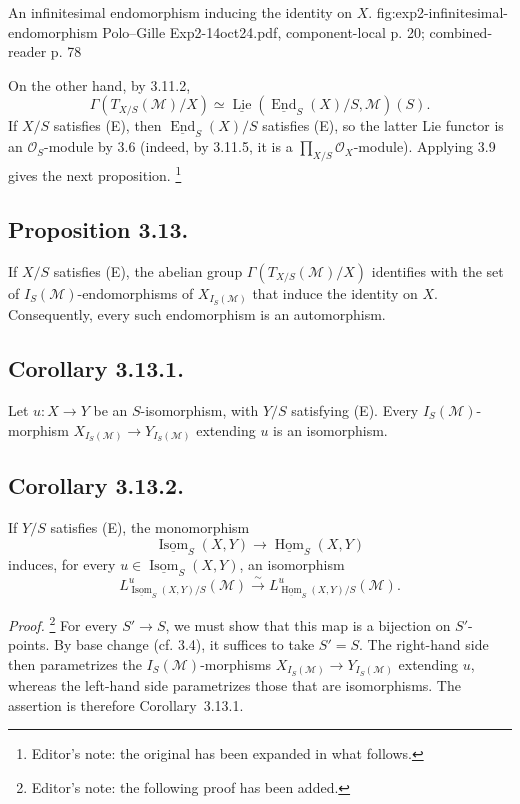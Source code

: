   {An infinitesimal endomorphism inducing the identity on \(X\).}
  {fig:exp2-infinitesimal-endomorphism}
  {Polo--Gille Exp2-14oct24.pdf, component-local p. 20; combined-reader p. 78}

On the other hand, by 3.11.2,
\[
  \Gamma(T_{X/S}(\mathcal M)/X)
  \simeq
  \underline{\operatorname{Lie}}
    (\underline{\operatorname{End}}_S(X)/S,\mathcal M)(S).
\]
If \(X/S\) satisfies (E), then
\(\underline{\operatorname{End}}_S(X)/S\) satisfies (E), so the latter
Lie functor is an \(\mathcal O_S\)-module by 3.6 (indeed, by 3.11.5, it
is a \(\prod_{X/S}\mathcal O_X\)-module). Applying 3.9 gives the next
proposition.
\footnote{Editor's note: the original has been expanded in what follows.}

\subsection*{Proposition 3.13.}
If \(X/S\) satisfies (E), the abelian group
\(\Gamma(T_{X/S}(\mathcal M)/X)\) identifies with the set of
\(I_S(\mathcal M)\)-endomorphisms of \(X_{I_S(\mathcal M)}\) that induce
the identity on \(X\). Consequently, every such endomorphism is an
automorphism.

\subsection*{Corollary 3.13.1.}
Let \(u:X\to Y\) be an \(S\)-isomorphism, with \(Y/S\) satisfying (E).
Every \(I_S(\mathcal M)\)-morphism
\(X_{I_S(\mathcal M)}\to Y_{I_S(\mathcal M)}\) extending \(u\) is an
isomorphism.

\subsection*{Corollary 3.13.2.}
If \(Y/S\) satisfies (E), the monomorphism
\[
  \underline{\operatorname{Isom}}_S(X,Y)
  \longrightarrow\underline{\operatorname{Hom}}_S(X,Y)
\]
induces, for every \(u\in\underline{\operatorname{Isom}}_S(X,Y)\), an
isomorphism
\[
  L^u_{\underline{\operatorname{Isom}}_S(X,Y)/S}(\mathcal M)
  \xrightarrow{\sim}
  L^u_{\underline{\operatorname{Hom}}_S(X,Y)/S}(\mathcal M).
\]

\emph{Proof.}
\footnote{Editor's note: the following proof has been added.}
For every \(S'\to S\), we must show that this map is a bijection on
\(S'\)-points. By base change (cf. 3.4), it suffices to take \(S'=S\).
The right-hand side then parametrizes the
\(I_S(\mathcal M)\)-morphisms
\(X_{I_S(\mathcal M)}\to Y_{I_S(\mathcal M)}\) extending \(u\), whereas
the left-hand side parametrizes those that are isomorphisms. The assertion
is therefore Corollary~3.13.1.

